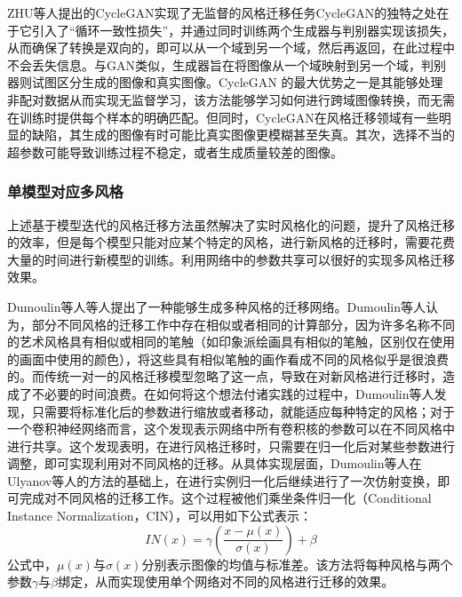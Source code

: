 ZHU等人\cite{zhuUnpairedImageToImageTranslation2017a}提出的CycleGAN实现了无监督的风格迁移任务CycleGAN的独特之处在于它引入了“循环一致性损失”，并通过同时训练两个生成器与判别器实现该损失，从而确保了转换是双向的，即可以从一个域到另一个域，然后再返回，在此过程中不会丢失信息。与GAN类似，生成器旨在将图像从一个域映射到另一个域，判别器则试图区分生成的图像和真实图像。CycleGAN 的最大优势之一是其能够处理非配对数据从而实现无监督学习，该方法能够学习如何进行跨域图像转换，而无需在训练时提供每个样本的明确匹配。但同时，CycleGAN在风格迁移领域有一些明显的缺陷，其生成的图像有时可能比真实图像更模糊甚至失真。其次，选择不当的超参数可能导致训练过程不稳定，或者生成质量较差的图像。

\subsubsection{单模型对应多风格}

上述基于模型迭代的风格迁移方法虽然解决了实时风格化的问题，提升了风格迁移的效率，但是每个模型只能对应某个特定的风格，进行新风格的迁移时，需要花费大量的时间进行新模型的训练。利用网络中的参数共享可以很好的实现多风格迁移效果。

Dumoulin等人\cite{dumoulinLearnedRepresentationArtistic2017}等人提出了一种能够生成多种风格的迁移网络。Dumoulin等人认为，部分不同风格的迁移工作中存在相似或者相同的计算部分，因为许多名称不同的艺术风格具有相似或相同的笔触（如印象派绘画具有相似的笔触，区别仅在使用的画面中使用的颜色），将这些具有相似笔触的画作看成不同的风格似乎是很浪费的。而传统一对一的风格迁移模型忽略了这一点，导致在对新风格进行迁移时，造成了不必要的时间浪费。在如何将这个想法付诸实践的过程中，Dumoulin等人\cite{dumoulinLearnedRepresentationArtistic2017}发现，只需要将标准化后的参数进行缩放或者移动，就能适应每种特定的风格；对于一个卷积神经网络而言，这个发现表示网络中所有卷积核的参数可以在不同风格中进行共享。这个发现表明，在进行风格迁移时，只需要在归一化后对某些参数进行调整，即可实现利用对不同风格的迁移。从具体实现层面，Dumoulin等人\cite{dumoulinLearnedRepresentationArtistic2017}在Ulyanov等人\cite{ulyanovTextureNetworksFeedforward2016b}的方法的基础上，在进行实例归一化后继续进行了一次仿射变换，即可完成对不同风格的迁移工作。这个过程被他们乘坐条件归一化（Conditional Instance Normalization，CIN），可以用如下公式表示：
\begin{equation}
    \label{IN}
    IN(x)=\gamma \left(\frac{x-\mu(x)}{\sigma(x)}\right)+\beta
\end{equation}
公式中，$\mu(x)$与$\sigma(x)$分别表示图像的均值与标准差。该方法将每种风格与两个参数$\gamma$与$\beta$绑定，从而实现使用单个网络对不同的风格进行迁移的效果。

